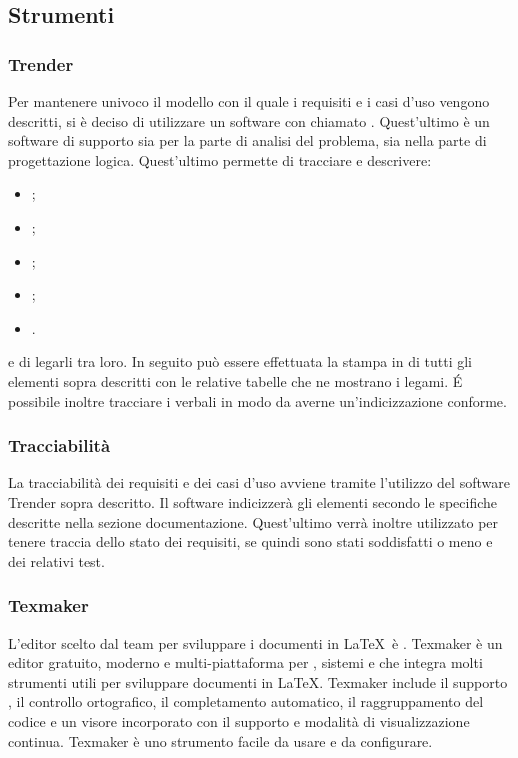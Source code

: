 \documentclass[../NormeDiProgetto.tex]{subfiles}
\begin{document}
      \subsection{Strumenti}
            \subsubsection{Trender}
            Per mantenere univoco il modello con il quale i requisiti e i casi d'uso vengono descritti, si è deciso di utilizzare un software con  chiamato .
            Quest'ultimo è un software di supporto sia per la parte di analisi del problema, sia nella parte di progettazione logica.
            Quest'ultimo permette di tracciare e descrivere:
            \begin{itemize}
                  \item {};
                  \item {};
                  \item {};
                  \item {};
                  \item {}.
            \end{itemize}
            e di legarli tra loro. In seguito può essere effettuata la stampa in \gl{\LaTeX} di tutti gli elementi sopra descritti con le relative tabelle che ne mostrano i legami. É possibile inoltre tracciare i verbali in modo da averne un'indicizzazione conforme.

            \subsubsection{Tracciabilità}
            La tracciabilità dei requisiti e dei casi d'uso avviene tramite l'utilizzo del software Trender sopra descritto. Il software indicizzerà gli elementi secondo le specifiche descritte nella sezione documentazione. Quest'ultimo verrà inoltre utilizzato per tenere traccia dello stato dei requisiti, se quindi sono stati soddisfatti o meno e dei relativi test.

            \subsubsection{Texmaker}
            L'editor scelto dal team per sviluppare i documenti in \LaTeX\ è . Texmaker è un editor gratuito, moderno e multi-piattaforma per , sistemi  e  che integra molti strumenti utili per sviluppare documenti in \LaTeX. Texmaker include il supporto , il controllo ortografico, il completamento automatico, il raggruppamento del codice e un visore incorporato  con il supporto  e modalità di visualizzazione continua. Texmaker è uno strumento facile da usare e da configurare.
\end{document}
